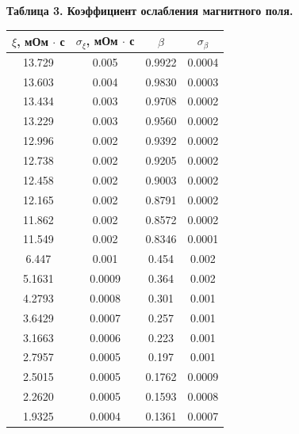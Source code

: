 \documentclass[15pt,a5paper,reqno]{article}
\begin{document}
    \newpage
    \noindent\hypertarget{table_3}{\textbf{Таблица 3. Коэффициент ослабления магнитного поля.}}
    \begin{center}
        \begin{tabular}{|c|c|c|c|}
            \hline
            $\xi$, мОм $\cdot$ с & $\sigma_{\xi}$, мОм $\cdot$ с & $\beta$ & $\sigma_{\beta}$ \\ \hline
            \hline
            13.729               & 0.005  & 0.9922 & 0.0004 \\ \hline
            13.603               & 0.004  & 0.9830 & 0.0003 \\ \hline
            13.434               & 0.003  & 0.9708 & 0.0002 \\ \hline
            13.229               & 0.003  & 0.9560 & 0.0002 \\ \hline
            12.996               & 0.002  & 0.9392 & 0.0002 \\ \hline
            12.738               & 0.002  & 0.9205 & 0.0002 \\ \hline
            12.458               & 0.002  & 0.9003 & 0.0002 \\ \hline
            12.165               & 0.002  & 0.8791 & 0.0002 \\ \hline
            11.862               & 0.002  & 0.8572 & 0.0002 \\ \hline
            11.549               & 0.002  & 0.8346 & 0.0001 \\ \hline
            \hline
            6.447                & 0.001    & 0.454  & 0.002  \\ \hline
            5.1631               & 0.0009   & 0.364	 & 0.002  \\ \hline
            4.2793               & 0.0008   & 0.301  & 0.001  \\ \hline
            3.6429               & 0.0007   & 0.257  & 0.001  \\ \hline
            3.1663               & 0.0006   & 0.223  & 0.001  \\ \hline
            2.7957               & 0.0005   & 0.197  & 0.001  \\ \hline
            2.5015               & 0.0005   & 0.1762 & 0.0009 \\ \hline
            2.2620               & 0.0005   & 0.1593 & 0.0008 \\ \hline
            1.9325               & 0.0004   & 0.1361 & 0.0007 \\ \hline
        \end{tabular}
    \end{center}
\end{document}
